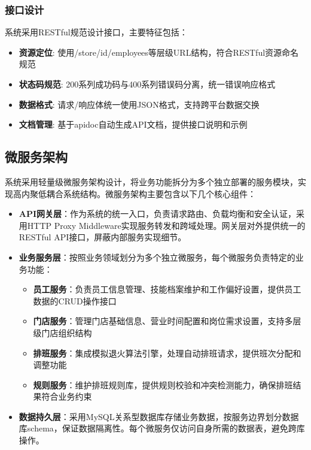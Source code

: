 \documentclass{ctexart}
\begin{document}
\subsubsection{接口设计}
系统采用RESTful规范设计接口，主要特征包括：
\begin{itemize}
    \item \textbf{资源定位}: 使用/store/{id}/employees等层级URL结构，符合RESTful资源命名规范
    \item \textbf{状态码规范}: 200系列成功码与400系列错误码分离，统一错误响应格式
    \item \textbf{数据格式}: 请求/响应体统一使用JSON格式，支持跨平台数据交换
    \item \textbf{文档管理}: 基于apidoc自动生成API文档，提供接口说明和示例
\end{itemize}

\subsection{微服务架构}
系统采用轻量级微服务架构设计，将业务功能拆分为多个独立部署的服务模块，实现高内聚低耦合系统结构。微服务架构主要包含以下几个核心组件：

\begin{itemize}
    \item \textbf{API网关层}：作为系统的统一入口，负责请求路由、负载均衡和安全认证，采用HTTP Proxy Middleware实现服务转发和跨域处理。网关层对外提供统一的RESTful API接口，屏蔽内部服务实现细节。
    
    \item \textbf{业务服务层}：按照业务领域划分为多个独立微服务，每个微服务负责特定的业务功能：
    \begin{itemize}
        \item \textbf{员工服务}：负责员工信息管理、技能档案维护和工作偏好设置，提供员工数据的CRUD操作接口
        \item \textbf{门店服务}：管理门店基础信息、营业时间配置和岗位需求设置，支持多层级门店组织结构
        \item \textbf{排班服务}：集成模拟退火算法引擎，处理自动排班请求，提供班次分配和调整功能
        \item \textbf{规则服务}：维护排班规则库，提供规则校验和冲突检测能力，确保排班结果符合业务约束
    \end{itemize}
    
    \item \textbf{数据持久层}：采用MySQL关系型数据库存储业务数据，按服务边界划分数据库schema，保证数据隔离性。每个微服务仅访问自身所需的数据表，避免跨库操作。
    
\end{itemize}
\end{document}

